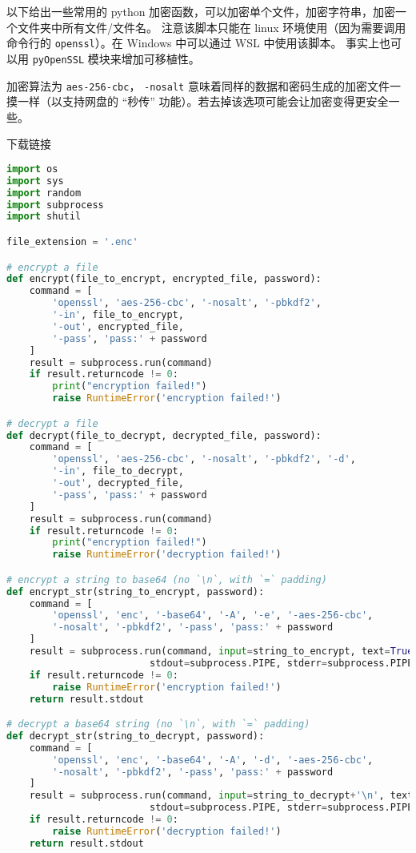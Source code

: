 

以下给出一些常用的 python 加密函数，可以加密单个文件，加密字符串，加密一个文件夹中所有文件/文件名。 注意该脚本只能在 linux 环境使用（因为需要调用命令行的 \verb`openssl`）。在 Windows 中可以通过 WSL 中使用该脚本。 事实上也可以用 \verb|pyOpenSSL| 模块来增加可移植性。

加密算法为 \verb`aes-256-cbc`， \verb`-nosalt` 意味着同样的数据和密码生成的加密文件一摸一样（以支持网盘的 “秒传” 功能）。若去掉该选项可能会让加密变得更安全一些。

下载链接

\begin{lstlisting}[language=python,caption=encrypt.py]
import os
import sys
import random
import subprocess
import shutil

file_extension = '.enc'

# encrypt a file
def encrypt(file_to_encrypt, encrypted_file, password):
	command = [
		'openssl', 'aes-256-cbc', '-nosalt', '-pbkdf2',
		'-in', file_to_encrypt,
		'-out', encrypted_file,
		'-pass', 'pass:' + password
	]
	result = subprocess.run(command)
	if result.returncode != 0:
		print("encryption failed!")
		raise RuntimeError('encryption failed!')

# decrypt a file
def decrypt(file_to_decrypt, decrypted_file, password):
	command = [
		'openssl', 'aes-256-cbc', '-nosalt', '-pbkdf2', '-d',
		'-in', file_to_decrypt,
		'-out', decrypted_file,
		'-pass', 'pass:' + password
	]
	result = subprocess.run(command)
	if result.returncode != 0:
		print("encryption failed!")
		raise RuntimeError('decryption failed!')

# encrypt a string to base64 (no `\n`, with `=` padding)
def encrypt_str(string_to_encrypt, password):
	command = [
		'openssl', 'enc', '-base64', '-A', '-e', '-aes-256-cbc',
		'-nosalt', '-pbkdf2', '-pass', 'pass:' + password
	]
	result = subprocess.run(command, input=string_to_encrypt, text=True,
						 stdout=subprocess.PIPE, stderr=subprocess.PIPE)
	if result.returncode != 0:
		raise RuntimeError('encryption failed!')
	return result.stdout

# decrypt a base64 string (no `\n`, with `=` padding)
def decrypt_str(string_to_decrypt, password):
	command = [
		'openssl', 'enc', '-base64', '-A', '-d', '-aes-256-cbc',
		'-nosalt', '-pbkdf2', '-pass', 'pass:' + password
	]
	result = subprocess.run(command, input=string_to_decrypt+'\n', text=True,
						 stdout=subprocess.PIPE, stderr=subprocess.PIPE)
	if result.returncode != 0:
		raise RuntimeError('decryption failed!')
	return result.stdout


\end{lstlisting}
